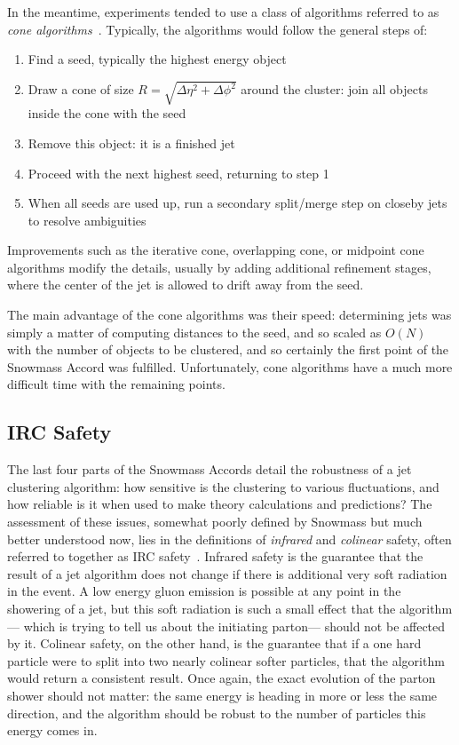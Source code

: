 In the meantime, experiments tended to use a class of algorithms referred to as \textit{cone algorithms}~\cite{Jetography}. Typically, the algorithms would follow the general steps of:
%
\begin{enumerate}
\item Find a seed, typically the highest energy object
\item Draw a cone of size $R = \sqrt{\Delta \eta^2 + \Delta \phi^2}$ around the cluster: join all objects inside the cone with the seed
\item Remove this object: it is a finished jet
\item Proceed with the next highest seed, returning to step 1
\item When all seeds are used up, run a secondary split/merge step on closeby jets to resolve ambiguities
\end{enumerate}
%
Improvements such as the iterative cone,  overlapping cone, or midpoint cone algorithms modify the details, usually by adding additional refinement stages, where the center of the jet is allowed to drift away from the seed.

The main advantage of the cone algorithms was their speed: determining jets was simply a matter of computing distances to the seed, and so scaled as $O(N)$ with the number of objects to be clustered, and so certainly the first point of the Snowmass Accord was fulfilled. Unfortunately, cone algorithms have a much more difficult time with the remaining points.

\subsection{IRC Safety}

The last four parts of the Snowmass Accords detail the robustness of a jet clustering algorithm: how sensitive is the clustering to various fluctuations, and how reliable is it when used to make theory calculations and predictions? The assessment of these issues, somewhat poorly defined by Snowmass but much better understood now, lies in the definitions of \textit{infrared} and \textit{colinear} safety, often referred to together as IRC safety~\cite{Jetography}. Infrared safety is the guarantee that the result of a jet algorithm does not change if there is additional very soft radiation in the event. A low energy gluon emission is possible at any point in the showering of a jet, but this soft radiation is such a small effect that the algorithm--- which is trying to tell us about the initiating parton--- should not be affected by it. Colinear safety, on the other hand, is the guarantee that if a one hard particle were to split into two nearly colinear softer particles, that the algorithm would return a consistent result. Once again, the exact evolution of the parton shower should not matter: the same energy is heading in more or less the same direction, and the algorithm should be robust to the number of particles this energy comes in.

